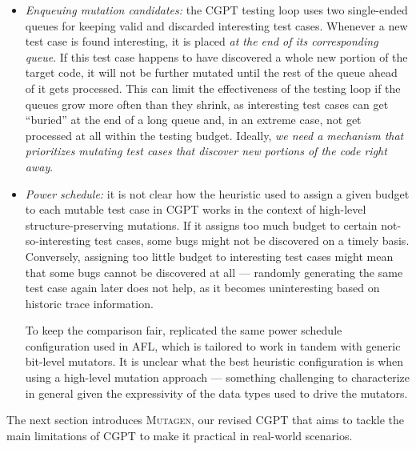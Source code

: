 \documentclass[sigconf, anonymous, review]{acmart}
\newcommand{\mutagen}{\textsc{Mutagen}\xspace}
\begin{document}
\begin{itemize}
\item \emph{Enqueuing mutation candidates:}
%
the CGPT testing loop uses two single-ended queues for keeping valid and
discarded interesting test cases.
%
Whenever a new test case is found interesting, it is placed \emph{at the end of
  its corresponding queue}.
%
If this test case happens to have discovered a whole new portion of the target
code, it will not be further mutated until the rest of the queue ahead of it
gets processed.
%
This can limit the effectiveness of the testing loop if the queues grow more
often than they shrink, as interesting test cases can get ``buried'' at the end
of a long queue and,
%
%
in an extreme case, not get processed at all within the testing budget.
%
Ideally, \emph{we need a mechanism that prioritizes mutating test cases that
  discover new portions of the code right away}.
%
%

\item \emph{Power schedule:}
%
it is not clear how the heuristic used to assign a given budget to each mutable
test case in CGPT works in the context of high-level structure-preserving
mutations.
%
If it assigns too much budget to certain not-so-interesting test cases, some
bugs might not be discovered on a timely basis.
%
Conversely, assigning too little budget to interesting test cases might mean
that some bugs cannot be discovered at all --- randomly generating the same test
case again later does not help, as it becomes uninteresting based on historic
trace information.

To keep the comparison fair, \citeauthor{lampropoulos2019coverage} replicated
the same power schedule configuration used in AFL, which is tailored to work in
tandem with generic bit-level mutators.
%
It is unclear what the best heuristic configuration is when using a high-level
mutation approach --- something challenging to characterize in general given the
expressivity of the data types used to drive the mutators.
\end{itemize}

The next section introduces \mutagen, our revised CGPT that aims to tackle the
main limitations of CGPT to make it practical in real-world scenarios.

\end{document}
